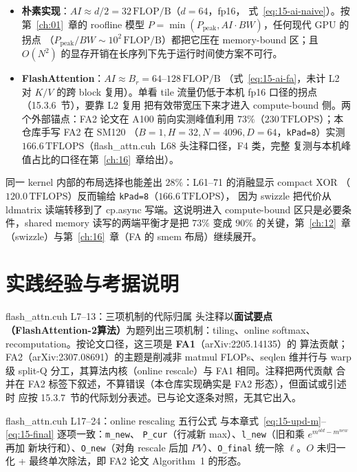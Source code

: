 \begin{itemize}
  \item \textbf{朴素实现}：$AI \approx d/2 = 32\,\mathrm{FLOP/B}$（$d{=}64$，fp16，
        式~\ref{eq:15-ai-naive}）。按第~\ref{ch:01}~章的 roofline 模型
        $P = \min(P_{\mathrm{peak}}, AI \cdot BW)$，任何现代 GPU 的拐点
        （$P_{\mathrm{peak}}/BW \sim 10^{2}\,\mathrm{FLOP/B}$）都把它压在
        memory-bound 区；且 $O(N^{2})$ 的显存开销在长序列下先于运行时间使方案不可行。
  \item \textbf{FlashAttention}：$AI \approx B_r = 64$--$128\,\mathrm{FLOP/B}$
        （式~\ref{eq:15-ai-fa}，未计 L2 对 $K/V$ 的跨 block 复用）。单看 tile
        流量仍低于本机 fp16 口径的拐点（15.3.6~节），要靠 L2 复用
        把有效带宽压下来才进入 compute-bound 侧。两个外部锚点：FA2 论文在 A100 前向实测峰值利用
        $73\%$（$230\,\mathrm{TFLOPS}$）；本仓库手写 FA2 在 SM120
        （$B{=}1, H{=}32, N{=}4096, D{=}64$，\texttt{kPad=8}）实测
        $166.6\,\mathrm{TFLOPS}$（flash\_attn.cuh~L68 头注释口径，F4 类，完整
        复测与本机峰值占比的口径在第~\ref{ch:16}~章给出）。
\end{itemize}

同一 kernel 内部的布局选择也能差出 $28\%$：L61--71 的消融显示 compact XOR
（$120.0\,\mathrm{TFLOPS}$）反而输给 \texttt{kPad=8}（$166.6\,\mathrm{TFLOPS}$），
因为 swizzle 把代价从 ldmatrix 读端转移到了 cp.async 写端。这说明进入 compute-bound
区只是必要条件，shared memory 读写的两端平衡才是把 $73\%$
变成 $90\%$ 的关键，第~\ref{ch:12}~章（swizzle）与第~\ref{ch:16}~章（FA 的
smem 布局）继续展开。

\section{实践经验与考据说明}

\begin{kaogu}[F5]{flash\_attn.cuh L7--13：三项机制的代际归属}
  头注释以\textbf{面试要点（FlashAttention-2算法）}为题列出三项机制：tiling、online
  softmax、recomputation。按论文口径，这三项是 \textbf{FA1}（arXiv:2205.14135）的
  算法贡献；FA2（arXiv:2307.08691）的主题是削减非 matmul FLOPs、seqlen 维并行与
  warp 级 split-Q 分工，其算法内核（online rescale）与 FA1 相同。注释把两代贡献
  合并在 FA2 标签下叙述，不算错误（本仓库实现确实是 FA2 形态），但面试或引述时
  应按 15.3.7~节的代际划分表述。已与论文逐条对照，无其它出入。
\end{kaogu}

\begin{kaogu}[F3 核校通过]{flash\_attn.cuh L17--24：online rescaling 五行公式}
  与本章式~\ref{eq:15-upd-m}--\ref{eq:15-final} 逐项一致：\texttt{m\_new}、
  \texttt{P\_cur}（行减新 max）、\texttt{l\_new}（旧和乘 $e^{m^{old}-m^{new}}$ 再加
  新块行和）、\texttt{O\_new}（对角 rescale 后加 $PV$）、\texttt{O\_final} 统一除
  $\ell$。$O$ 未归一化 + 最终单次除法，即 FA2 论文 Algorithm~1 的形态。
\end{kaogu}

